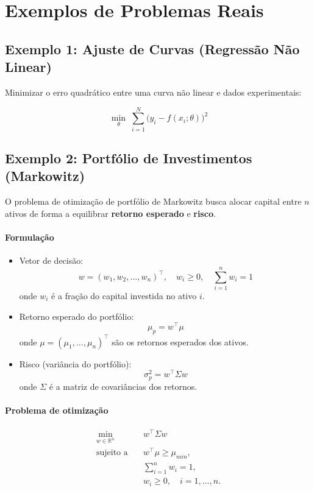 \documentclass[9pt,a4paper]{extarticle}
\begin{document}
\section{Exemplos de Problemas Reais}

\subsection*{Exemplo 1: Ajuste de Curvas (Regressão Não Linear)}
Minimizar o erro quadrático entre uma curva não linear e dados experimentais:

\[
\min_{\theta} \; \sum_{i=1}^N \big(y_i - f(x_i;\theta)\big)^2
\]

\subsection*{Exemplo 2: Portfólio de Investimentos (Markowitz)}

O problema de otimização de portfólio de Markowitz busca alocar capital entre $n$ ativos de forma a equilibrar \textbf{retorno esperado} e \textbf{risco}.

\paragraph{Formulação}
\begin{itemize}
    \item Vetor de decisão:
    \[
    w = (w_1, w_2, \dots, w_n)^\top, \quad w_i \geq 0, \quad \sum_{i=1}^n w_i = 1
    \]
    onde $w_i$ é a fração do capital investida no ativo $i$.
    \item Retorno esperado do portfólio:
    \[
    \mu_p = w^\top \mu
    \]
    onde $\mu = (\mu_1, \dots, \mu_n)^\top$ são os retornos esperados dos ativos.
    \item Risco (variância do portfólio):
    \[
    \sigma_p^2 = w^\top \Sigma w
    \]
    onde $\Sigma$ é a matriz de covariâncias dos retornos.
\end{itemize}

\paragraph{Problema de otimização}
\[
\begin{aligned}
\min_{w \in \mathbb{R}^n} \quad & w^\top \Sigma w \\
\text{sujeito a} \quad & w^\top \mu \geq \mu_{min}, \\
& \sum_{i=1}^n w_i = 1, \\
& w_i \geq 0, \quad i=1,\dots,n.
\end{aligned}
\]
\end{document}
